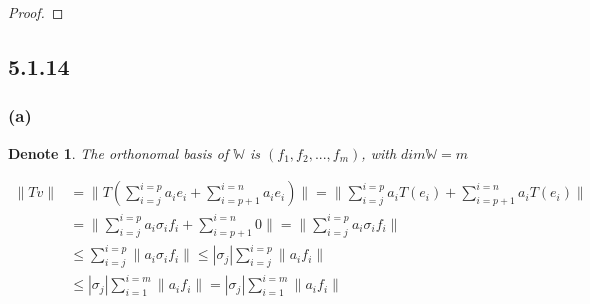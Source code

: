 \documentclass{article}
\newtheorem*{denote}{Denote}
\newtheorem*{proof}{Proof}
\begin{document}
\begin{proof}
\end{proof}

\subsection*{5.1.14}
\subsubsection*{(a)}
\begin{denote}
    The orthonomal basis of $\mathbb{W}$ is $(f_1, f_2, ..., f_m)$, with $dim \mathbb{W} = m$
\end{denote}
\begin{equation*}
    \begin{split}
        \|Tv\| &= \|T(\sum_{i = j}^{i=p} a_ie_i + \sum_{i = p+1}^{i=n} a_ie_i)\| = \| \sum_{i = j}^{i=p} a_iT(e_i) + \sum_{i = p+1}^{i=n} a_iT(e_i)\| \\
            & = \| \sum_{i = j}^{i=p} a_i\sigma_if_i + \sum_{i = p+1}^{i=n} 0 \| = \| \sum_{i = j}^{i=p} a_i\sigma_if_i\| \\
            & \le \sum_{i = j}^{i=p} \| a_i\sigma_if_i\| \le |\sigma_j| \sum_{i = j}^{i=p} \| a_if_i\| \\
            & \le |\sigma_j| \sum_{i = 1}^{i=m} \| a_if_i\| = |\sigma_j| \sum_{i = 1}^{i=m} \| a_if_i\|
    \end{split} 
\end{equation*}
\end{document}

